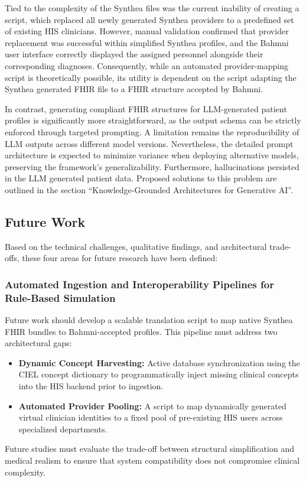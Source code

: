 Tied to the complexity of the Synthea files was the current inability of creating a script, which replaced all newly generated Synthea providers to a predefined set of existing HIS clinicians. However, manual validation confirmed that provider replacement was successful within simplified Synthea profiles, and the Bahmni user interface correctly displayed the assigned personnel alongside their corresponding diagnoses. Consequently, while an automated provider-mapping script is theoretically possible, its utility is dependent on the script adapting the Synthea generated FHIR file to a FHIR structure accepted by Bahmni.

In contrast, generating compliant FHIR structures for LLM-generated patient profiles is significantly more straightforward, as the output schema can be strictly enforced through targeted prompting. A limitation remains the reproducibility of LLM outputs across different model versions. Nevertheless, the detailed prompt architecture is expected to minimize variance when deploying alternative models, preserving the framework's generalizability. Furthermore, hallucinations persisted in the LLM generated patient data. Proposed solutions to this problem are outlined in the section \enquote{Knowledge-Grounded Architectures for Generative AI}.

\subsection*{Future Work}
\label{sec:further_research}
Based on the technical challenges, qualitative findings, and architectural trade-offs, these four areas for future research have been defined:

\subsubsection{Automated Ingestion and Interoperability Pipelines for Rule-Based Simulation}
Future work should develop a scalable translation script to map native Synthea FHIR bundles to Bahmni-accepted profiles. This pipeline must address two architectural gaps:
\begin{itemize}
    \item \textbf{Dynamic Concept Harvesting:} Active database synchronization using the CIEL concept dictionary to programmatically inject missing clinical concepts into the HIS backend prior to ingestion.
    \item \textbf{Automated Provider Pooling:} A script to map dynamically generated virtual clinician identities to a fixed pool of pre-existing HIS users across specialized departments.
\end{itemize}
Future studies must evaluate the trade-off between structural simplification and medical realism to ensure that system compatibility does not compromise clinical complexity.

